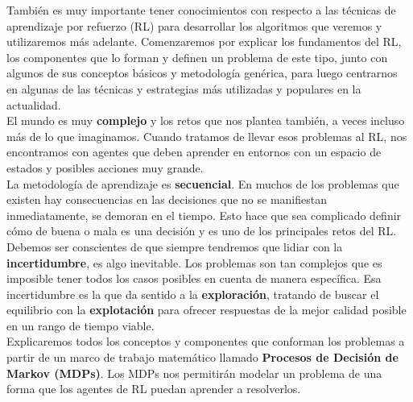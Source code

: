 \documentclass[11pt,fleqn]{book} %
\begin{document}
También es muy importante tener conocimientos con respecto a las técnicas de aprendizaje por refuerzo (RL) para desarrollar los algoritmos que veremos y utilizaremos más adelante. Comenzaremos por explicar los fundamentos del RL, los componentes que lo forman y definen un problema de este tipo, junto con algunos de sus conceptos básicos y metodología genérica, para luego centrarnos en algunas de las técnicas y estrategias más utilizadas y populares en la actualidad. \\

El mundo es muy \textbf{complejo} y los retos que nos plantea también, a veces incluso más de lo que imaginamos. Cuando tratamos de llevar esos problemas al RL, nos encontramos con agentes que deben aprender en entornos con un espacio de estados y posibles acciones muy grande. \\

La metodología de aprendizaje es \textbf{secuencial}. En muchos de los problemas que existen hay consecuencias en las decisiones que no se manifiestan inmediatamente, se demoran en el tiempo. Esto hace que sea complicado definir cómo de buena o mala es una decisión y es uno de los principales retos del RL. \\

Debemos ser conscientes de que siempre tendremos que lidiar con la \textbf{incertidumbre}, es algo inevitable. Los problemas son tan complejos que es imposible tener todos los casos posibles en cuenta de manera específica. Esa incertidumbre es la que da sentido a la \textbf{exploración}, tratando de buscar el equilibrio con la \textbf{explotación} para ofrecer respuestas de la mejor calidad posible en un rango de tiempo viable.\\

Explicaremos todos los conceptos y componentes que conforman los problemas a partir de un marco de trabajo matemático llamado \textbf{Procesos de Decisión de Markov (MDPs)}. Los MDPs nos permitirán modelar un problema de una forma que los agentes de RL puedan aprender a resolverlos. \cite{book:miguel} \cite{article:RLromero} \cite{book:barto}  \\ 

\end{document}
